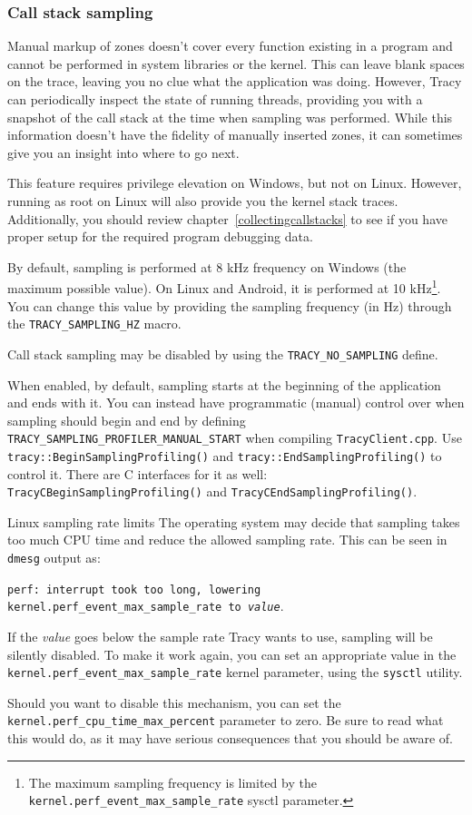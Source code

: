 \documentclass[hidelinks,titlepage,a4paper,twoside]{article}
\begin{document}
\subsubsection{Call stack sampling}
\label{sampling}

Manual markup of zones doesn't cover every function existing in a program and cannot be performed in system libraries or the kernel. This can leave blank spaces on the trace, leaving you no clue what the application was doing. However, Tracy can periodically inspect the state of running threads, providing you with a snapshot of the call stack at the time when sampling was performed. While this information doesn't have the fidelity of manually inserted zones, it can sometimes give you an insight into where to go next.

This feature requires privilege elevation on Windows, but not on Linux. However, running as root on Linux will also provide you the kernel stack traces. Additionally, you should review chapter~\ref{collectingcallstacks} to see if you have proper setup for the required program debugging data.

By default, sampling is performed at 8 kHz frequency on Windows (the maximum possible value). On Linux and Android, it is performed at 10 kHz\footnote{The maximum sampling frequency is limited by the \texttt{kernel.perf\_event\_max\_sample\_rate} sysctl parameter.}. You can change this value by providing the sampling frequency (in Hz) through the \texttt{TRACY\_SAMPLING\_HZ} macro.

Call stack sampling may be disabled by using the \texttt{TRACY\_NO\_SAMPLING} define.

When enabled, by default, sampling starts at the beginning of the application and ends with it. You can instead have programmatic (manual) control over when sampling should begin and end by defining \texttt{TRACY\_SAMPLING\_PROFILER\_MANUAL\_START} when compiling \texttt{TracyClient.cpp}. Use \texttt{tracy::BeginSamplingProfiling()} and \texttt{tracy::EndSamplingProfiling()} to control it. There are C interfaces for it as well: \texttt{TracyCBeginSamplingProfiling()} and \texttt{TracyCEndSamplingProfiling()}.

\begin{bclogo}[
noborder=true,
couleur=black!5,
logo=\bcbombe
]{Linux sampling rate limits}
The operating system may decide that sampling takes too much CPU time and reduce the allowed sampling rate. This can be seen in \texttt{dmesg} output as:

\texttt{perf: interrupt took too long, lowering kernel.perf\_event\_max\_sample\_rate to \emph{value}}.

If the \emph{value} goes below the sample rate Tracy wants to use, sampling will be silently disabled. To make it work again, you can set an appropriate value in the \texttt{kernel.perf\_event\_max\_sample\_rate} kernel parameter, using the \texttt{sysctl} utility.

Should you want to disable this mechanism, you can set the \texttt{kernel.perf\_cpu\_time\_max\_percent} parameter to zero. Be sure to read what this would do, as it may have serious consequences that you should be aware of.
\end{bclogo}
\end{document}
